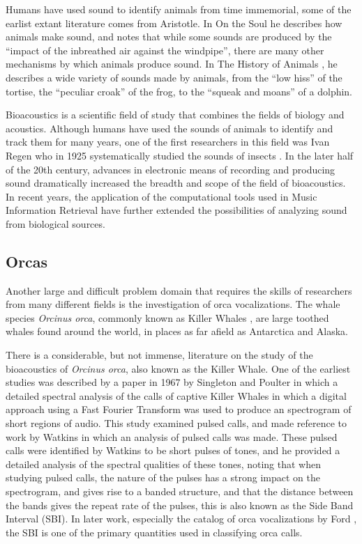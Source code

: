 Humans have used sound to identify animals from time immemorial, some
of the earlist extant literature comes from Aristotle.  In On the Soul
\cite{aristotleA} he describes how animals make sound, and notes that
while some sounds are produced by the ``impact of the inbreathed air
against the windpipe'', there are many other mechanisms by which
animals produce sound.  In The History of Animals \cite{aristotleB},
he describes a wide variety of sounds made by animals, from the ``low
hiss'' of the tortise, the ``peculiar croak'' of the frog, to the
``squeak and moans'' of a dolphin.

Bioacoustics is a scientific field of study that combines the fields
of biology and acoustics.  Although humans have used the sounds of
animals to identify and track them for many years, one of the first
researchers in this field was Ivan Regen who in 1925 systematically
studied the sounds of insects \cite{zarnik29}.  In the later half of
the 20th century, advances in electronic means of recording and
producing sound dramatically increased the breadth and scope of the
field of bioacoustics.  In recent years, the application of the
computational tools used in Music Information Retrieval have further
extended the possibilities of analyzing sound from biological sources.


\subsection{Orcas}

Another large and difficult problem domain that requires the skills of
researchers from many different fields is the investigation of orca
vocalizations.  The whale species \emph{Orcinus orca}, commonly known
as Killer Whales \cite{ford00_book_killer_whales}, are large toothed
whales found around the world, in places as far afield as Antarctica
and Alaska\cite{estes09_orca_alaska_decline}.

There is a considerable, but not immense, literature on the study of
the bioacoustics of \textit{Orcinus orca}, also known as the Killer
Whale.  One of the earliest studies was described by a paper in 1967
by Singleton and Poulter \cite{singleton67} in which a detailed
spectral analysis of the calls of captive Killer Whales in which a
digital approach using a Fast Fourier Transform was used to produce an
spectrogram of short regions of audio.  This study examined pulsed
calls, and made reference to work by Watkins \cite{watkins67} in which
an analysis of pulsed calls was made.  These pulsed calls were
identified by Watkins to be short pulses of tones, and he provided a
detailed analysis of the spectral qualities of these tones, noting
that when studying pulsed calls, the nature of the pulses has a strong
impact on the spectrogram, and gives rise to a banded structure, and
that the distance between the bands gives the repeat rate of the
pulses, this is also known as the Side Band Interval (SBI).  In later
work, especially the catalog of orca vocalizations by Ford
\cite{ford87}, the SBI is one of the primary quantities used in
classifying orca calls.  

